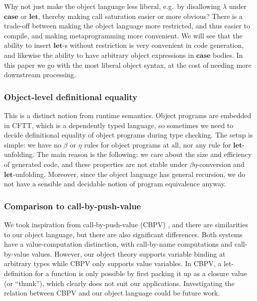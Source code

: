 \documentclass[acmsmall]{acmart}
\newcommand{\mbf}[1]{{\mathbf{#1}}}
\theoremstyle{remark}
\begin{document}
Why not just make the object language less liberal, e.g.\ by disallowing
$\lambda$ under $\mbf{case}$ or $\mbf{let}$, thereby making call saturation
easier or more obvious? There is a trade-off between making the object language
more restricted, and thus easier to compile, and making metaprogramming more
convenient. We will see that the ability to insert $\mbf{let}$-s without
restriction is very convenient in code generation, and likewise the ability to
have arbitrary object expressions in $\mbf{case}$ bodies. In this paper we go
with the most liberal object syntax, at the cost of needing more downstream
processing.


\subsubsection{Object-level definitional equality} This is a distinct notion
from runtime semantics. Object programs are embedded in CFTT, which is a
dependently typed language, so sometimes we need to decide definitional equality of
object programs during type checking. The setup is simple: we have no $\beta$ or
$\eta$ rules for object programs at all, nor any rule for $\mbf{let}$-unfolding.
The main reason is the following: we care about the size and efficiency of
generated code, and these properties are not stable under $\beta\eta$-conversion
and $\mbf{let}$-unfolding. Moreover, since the object language has general
recursion, we do not have a sensible and decidable notion of program equivalence
anyway.

\subsubsection{Comparison to call-by-push-value}
We took inspiration from call-by-push-value (CBPV) \cite{DBLP:conf/tlca/Levy99},
and there are similarities to our object language, but there are also
significant differences. Both systems have a value-computation distinction, with
call-by-name computations and call-by-value values. However, our object theory
supports variable binding at arbitrary types while CBPV only supports value
variables. In CBPV, a let-definition for a function is only possible by first
packing it up as a closure value (or ``thunk''), which clearly does not suit our
applications.  Investigating the relation between CBPV and our object language
could be future work.
\end{document}

